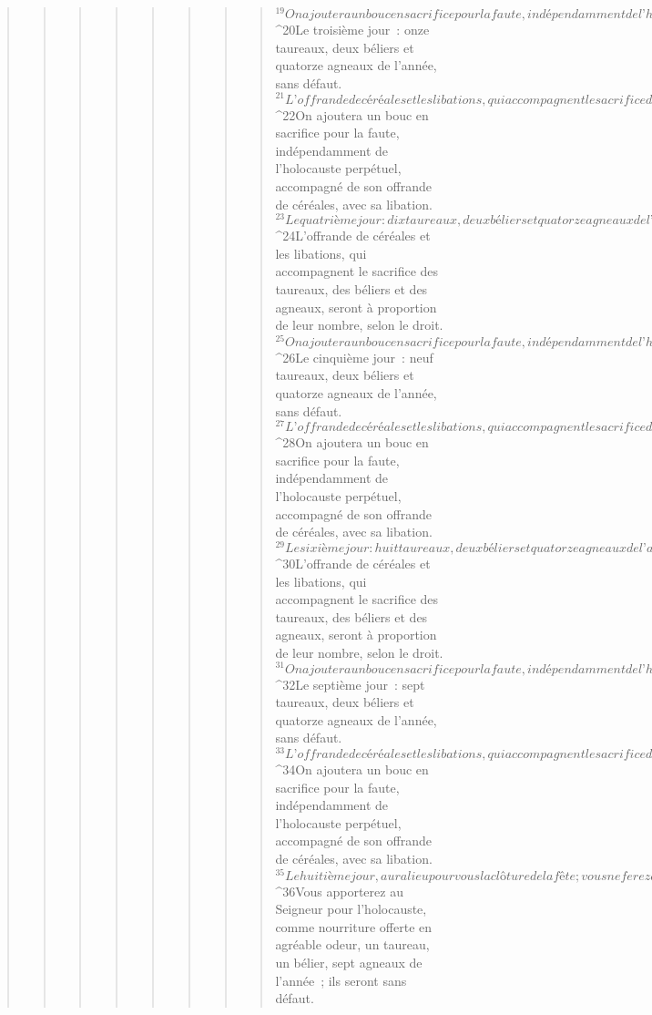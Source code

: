 \begin{verse}
\begin{verse}
\begin{verse}
\begin{verse}
\begin{verse}
\begin{verse}
\begin{verse}
\begin{verse}
${}^{19}On ajoutera un bouc en sacrifice pour la faute, indépendamment de l’holocauste perpétuel, accompagné de son offrande de céréales, avec les libations.
${}^{20}Le troisième jour : onze taureaux, deux béliers et quatorze agneaux de l’année, sans défaut. 
${}^{21}L’offrande de céréales et les libations, qui accompagnent le sacrifice des taureaux, des béliers et des agneaux, seront à proportion de leur nombre, selon le droit. 
${}^{22}On ajoutera un bouc en sacrifice pour la faute, indépendamment de l’holocauste perpétuel, accompagné de son offrande de céréales, avec sa libation.
${}^{23}Le quatrième jour : dix taureaux, deux béliers et quatorze agneaux de l’année, sans défaut. 
${}^{24}L’offrande de céréales et les libations, qui accompagnent le sacrifice des taureaux, des béliers et des agneaux, seront à proportion de leur nombre, selon le droit. 
${}^{25}On ajoutera un bouc en sacrifice pour la faute, indépendamment de l’holocauste perpétuel, accompagné de son offrande de céréales, avec sa libation.
${}^{26}Le cinquième jour : neuf taureaux, deux béliers et quatorze agneaux de l’année, sans défaut. 
${}^{27}L’offrande de céréales et les libations, qui accompagnent le sacrifice des taureaux, des béliers et des agneaux, seront à proportion de leur nombre, selon le droit. 
${}^{28}On ajoutera un bouc en sacrifice pour la faute, indépendamment de l’holocauste perpétuel, accompagné de son offrande de céréales, avec sa libation.
${}^{29}Le sixième jour : huit taureaux, deux béliers et quatorze agneaux de l’année, sans défaut. 
${}^{30}L’offrande de céréales et les libations, qui accompagnent le sacrifice des taureaux, des béliers et des agneaux, seront à proportion de leur nombre, selon le droit. 
${}^{31}On ajoutera un bouc en sacrifice pour la faute, indépendamment de l’holocauste perpétuel, accompagné de son offrande de céréales, avec ses libations.
${}^{32}Le septième jour : sept taureaux, deux béliers et quatorze agneaux de l’année, sans défaut. 
${}^{33}L’offrande de céréales et les libations, qui accompagnent le sacrifice des taureaux, des béliers et des agneaux, seront à proportion de leur nombre, selon le droit. 
${}^{34}On ajoutera un bouc en sacrifice pour la faute, indépendamment de l’holocauste perpétuel, accompagné de son offrande de céréales, avec sa libation.
${}^{35}Le huitième jour, aura lieu pour vous la clôture de la fête ; vous ne ferez aucun travail, aucun labeur. 
${}^{36}Vous apporterez au Seigneur pour l’holocauste, comme nourriture offerte en agréable odeur, un taureau, un bélier, sept agneaux de l’année ; ils seront sans défaut. 

\end{verse}
\end{verse}
\end{verse}
\end{verse}
\end{verse}
\end{verse}
\end{verse}
\end{verse}
